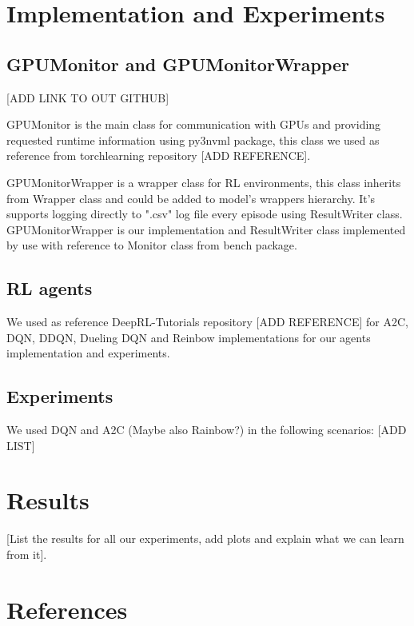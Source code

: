 \documentclass[11 pt, twocolumn]{article}
\begin{document}
\section{Implementation and Experiments}
\subsection{GPUMonitor and GPUMonitorWrapper}
[ADD LINK TO OUT GITHUB]


GPUMonitor is the main class for communication with GPUs and providing requested runtime information using py3nvml package, this class we used as reference from 
torchlearning repository [ADD REFERENCE].


GPUMonitorWrapper is a wrapper class for RL environments, this class inherits from Wrapper class and could be added to model's wrappers hierarchy. It's supports logging directly to ".csv" log file every episode using ResultWriter class. GPUMonitorWrapper is our implementation and ResultWriter class implemented by use with reference to Monitor class from bench package.

\subsection{RL agents}
We used as reference DeepRL-Tutorials repository [ADD REFERENCE] for A2C, DQN, DDQN, Dueling DQN and Reinbow implementations for our agents implementation and experiments.

\subsection{Experiments}
We used DQN and A2C (Maybe also Rainbow?) in the following scenarios: [ADD LIST]

\section{Results}
[List the results for all our experiments, add plots and explain what we can learn from it].


\section{References}
\end{document}
